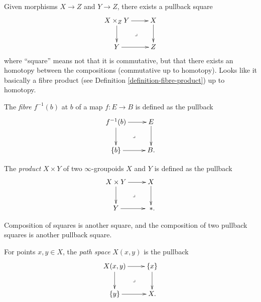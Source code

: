 \medskip\noindent
Given morphisms $X \to Z$ and $Y \to Z$,
there exists a pullback square
$$
\xymatrix{
X\times_Z Y\ar[r]\ar[d]\ar@{}[dr]|-{\lrcorner}&X\ar[d]\\
Y\ar[r]&Z
}
$$
where ``square'' means not that it is commutative,
but that there exists an homotopy between
the compositions (commutative up to homotopy).
Looks like it basically a fibre product
(see Definition \ref{definition-fibre-product})
up to homotopy.

The {\it fibre} $f^{-1}(b)$ at $b$ of a map
$f:E\to B$ is defined as the pullback
$$
\xymatrix{
f^{-1}(b)\ar[r]\ar[d]\ar@{}[dr]|-{\lrcorner}&E\ar[d]\\
\{b\}\ar[r]&B.
}
$$

The {\it product} $X\times Y$ of two $\infty$-groupoids
$X$ and  $Y$ is defined as the pullback
$$
\xymatrix{
X\times Y\ar[r]\ar[d]\ar@{}[dr]|-{\lrcorner}&X\ar[d]\\
Y\ar[r]& \ *.
}
$$

\medskip\noindent
Composition of squares is another square,
and the composition of two pullback squares
is another pullback square.

\begin{definition}
\label{definition-path-space}
For points $x,y \in X$, the {\it path space} $X(x,y)$ 
is the pullback
$$
\xymatrix{
X(x,y)\ar[r]\ar[d]\ar@{}[dr]|-{\lrcorner}&\{x\}\ar[d]\\
\{y\}\ar[r]&X.
}
$$
\end{definition}

 




